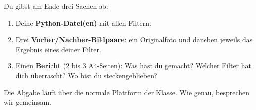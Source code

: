 Du gibst am Ende drei Sachen ab:

\begin{enumerate}
  \item Deine \textbf{Python-Datei(en)} mit allen Filtern.
  \item Drei \textbf{Vorher/Nachher-Bildpaare}: ein Originalfoto und
    daneben jeweils das Ergebnis eines deiner Filter.
  \item Einen \textbf{Bericht} (2 bis 3 A4-Seiten): Was hast du
    gemacht? Welcher Filter hat dich \"uberrascht? Wo bist du steckengeblieben?
\end{enumerate}

Die Abgabe l\"auft \"uber die normale Plattform der Klasse. Wie genau,
besprechen wir gemeinsam.

\closechapter
